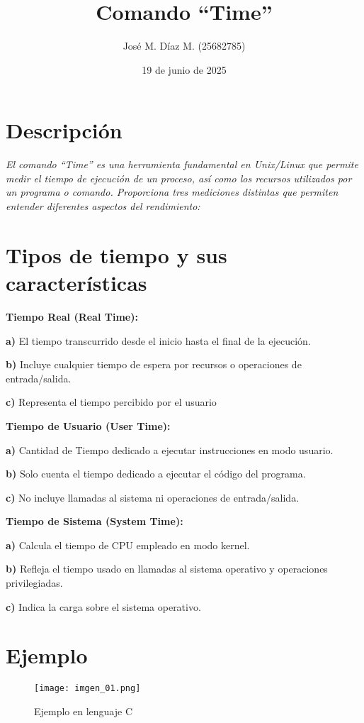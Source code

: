 \documentclass{article}
\title{Comando “Time”}
\author{José M. Díaz M. (25682785)}
\date{19 de junio de 2025}
\begin{document}
\maketitle

\section{Descripción}

\quad

\textit{El comando “Time” es una herramienta fundamental en Unix/Linux que permite medir el tiempo de ejecución de un proceso, así como los recursos utilizados por un programa o comando. Proporciona tres mediciones distintas que permiten entender diferentes aspectos del rendimiento:}

\quad

\section{Tipos de tiempo y sus características}

\quad

\textbf{Tiempo Real (Real Time):}

\quad

\textbf{a)}{ El tiempo transcurrido desde el inicio hasta el final de la ejecución.}

\textbf{b)}{ Incluye cualquier tiempo de espera por recursos o operaciones de entrada/salida.}

\textbf{c)}{ Representa el tiempo percibido por el usuario}

\quad

\textbf{Tiempo de Usuario (User Time):}

\quad

\textbf{a)}{ Cantidad de Tiempo dedicado a ejecutar instrucciones en modo usuario.}

\textbf{b)}{ Solo cuenta el tiempo dedicado a ejecutar el código del programa.}

\textbf{c)}{ No incluye llamadas al sistema ni operaciones de entrada/salida.}

\quad

\textbf{Tiempo de Sistema (System Time):}

\quad

\textbf{a)}{ Calcula el tiempo de CPU empleado en modo kernel.}

\textbf{b)}{ Refleja el tiempo usado en llamadas al sistema operativo y operaciones privilegiadas.}

\textbf{c)}{ Indica la carga sobre el sistema operativo.}

\quad

\section{Ejemplo}


\begin{figure}[h]
    \centering
    \texttt{[image: imgen\_01.png]}
    \caption{Ejemplo en lenguaje C}
    \label{fig:img1}
\end{figure}
\end{document}
